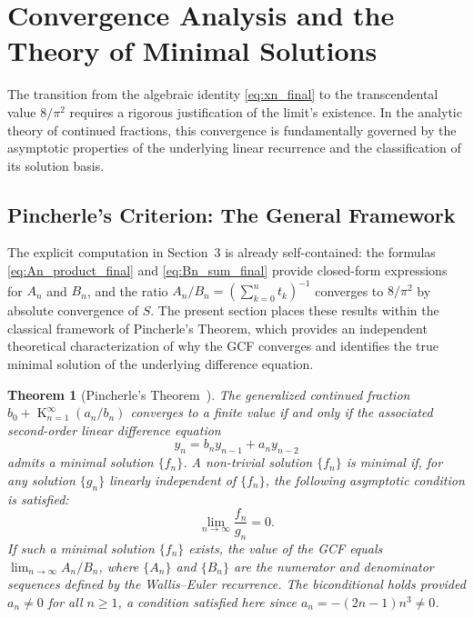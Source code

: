 \documentclass[pdflatex,sn-mathphys-num]{sn-jnl}
\DeclareMathOperator*{\K}{K}
\theoremstyle{thmstyleone}
\newtheorem{theorem}{Theorem}[section]
\theoremstyle{thmstyletwo}
\theoremstyle{thmstylethree}
\begin{document}
	\section{Convergence Analysis and the Theory of Minimal Solutions}
	
	The transition from the algebraic identity \eqref{eq:xn_final} to the transcendental value $8/\pi^2$ requires a rigorous justification of the limit's existence. In the analytic theory of continued fractions, this convergence is fundamentally governed by the asymptotic properties of the underlying linear recurrence and the classification of its solution basis.
	
	\subsection{Pincherle's Criterion: The General Framework}
	
	The explicit computation in Section~3 is already self-contained: the formulas \eqref{eq:An_product_final} and \eqref{eq:Bn_sum_final} provide closed-form expressions for $A_n$ and $B_n$, and the ratio $A_n/B_n = (\sum_{k=0}^n t_k)^{-1}$ converges to $8/\pi^2$ by absolute convergence of $S$. The present section places these results within the classical framework of Pincherle's Theorem, which provides an independent theoretical characterization of why the GCF converges and identifies the true minimal solution of the underlying difference equation.
	
	\begin{theorem}[Pincherle's Theorem~{\cite{Pincherle1894,Gautschi1967}}]
		The generalized continued fraction $b_0 + \K_{n=1}^\infty (a_n / b_n)$ converges to a finite value if and only if the associated second-order linear difference equation
		\begin{equation}\label{eq:rec_pincherle}
			y_n = b_n y_{n-1} + a_n y_{n-2}
		\end{equation}
		admits a minimal solution $\{f_n\}$. A non-trivial solution $\{f_n\}$ is minimal if, for any solution $\{g_n\}$ linearly independent of $\{f_n\}$, the following asymptotic condition is satisfied:
		\begin{equation}
			\lim_{n \to \infty} \frac{f_n}{g_n} = 0.
		\end{equation}
		If such a minimal solution $\{f_n\}$ exists, the value of the GCF equals $\lim_{n\to\infty} A_n/B_n$, where $\{A_n\}$ and $\{B_n\}$ are the numerator and denominator sequences defined by the Wallis--Euler recurrence.
		The biconditional holds provided $a_n \neq 0$ for all $n \geq 1$, a condition satisfied here since $a_n = -(2n-1)n^3 \neq 0$.
	\end{theorem}
	
\end{document}
